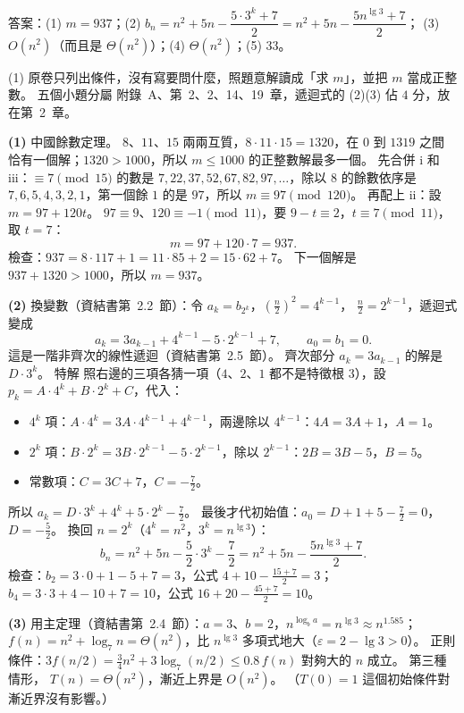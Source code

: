 \begin{pastsoln}
答案：(1) $m = 937$；(2) $b_n = n^2 + 5n - \dfrac{5 \cdot 3^k + 7}{2} = n^2 + 5n - \dfrac{5n^{\lg 3} + 7}{2}$；
(3) $O(n^2)$（而且是 $\Theta(n^2)$）；(4) $\Theta(n^2)$；(5) $33$。

(1) 原卷只列出條件，沒有寫要問什麼，照題意解讀成「求 $m$」，並把 $m$ 當成正整數。 五個小題分屬
附錄~A、第~2、2、14、19~章，遞迴式的 (2)(3) 佔 $4$ 分，放在第~2~章。

\textbf{(1)} 中國餘數定理。 $8$、$11$、$15$ 兩兩互質，$8 \cdot 11 \cdot 15 = 1320$，在 $0$ 到 $1319$ 之間
恰有一個解；$1320 > 1000$，所以 $m \le 1000$ 的正整數解最多一個。 先合併 i 和 iii：$\equiv 7 \pmod{15}$
的數是 $7, 22, 37, 52, 67, 82, 97, \ldots$，除以 $8$ 的餘數依序是 $7, 6, 5, 4, 3, 2, 1$，第一個餘 $1$ 的是
$97$，所以 $m \equiv 97 \pmod{120}$。 再配上 ii：設 $m = 97 + 120t$。 $97 \equiv 9$、$120 \equiv -1
\pmod{11}$，要 $9 - t \equiv 2$，$t \equiv 7 \pmod{11}$，取 $t = 7$：
\[
m = 97 + 120 \cdot 7 = 937 .
\]
檢查：$937 = 8 \cdot 117 + 1 = 11 \cdot 85 + 2 = 15 \cdot 62 + 7$。 下一個解是 $937 + 1320 > 1000$，所以
$m = 937$。

\textbf{(2)} 換變數（資結書第~2.2~節）：令 $a_k = b_{2^k}$，$\left(\frac n2\right)^2 = 4^{k-1}$，
$\frac n2 = 2^{k-1}$，遞迴式變成
\[
a_k = 3a_{k-1} + 4^{k-1} - 5 \cdot 2^{k-1} + 7,\qquad a_0 = b_1 = 0 .
\]
這是一階非齊次的線性遞迴（資結書第~2.5~節）。 齊次部分 $a_k = 3a_{k-1}$ 的解是 $D \cdot 3^k$。 特解
照右邊的三項各猜一項（$4$、$2$、$1$ 都不是特徵根 $3$），設 $p_k = A \cdot 4^k + B \cdot 2^k + C$，代入：
\begin{itemize}
\item $4^k$ 項：$A \cdot 4^k = 3A \cdot 4^{k-1} + 4^{k-1}$，兩邊除以 $4^{k-1}$：$4A = 3A + 1$，$A = 1$。
\item $2^k$ 項：$B \cdot 2^k = 3B \cdot 2^{k-1} - 5 \cdot 2^{k-1}$，除以 $2^{k-1}$：$2B = 3B - 5$，$B = 5$。
\item 常數項：$C = 3C + 7$，$C = -\frac72$。
\end{itemize}
所以 $a_k = D \cdot 3^k + 4^k + 5 \cdot 2^k - \frac72$。 最後才代初始值：$a_0 = D + 1 + 5 - \frac72 = 0$，
$D = -\frac52$。 換回 $n = 2^k$（$4^k = n^2$，$3^k = n^{\lg 3}$）：
\[
b_n = n^2 + 5n - \frac{5}{2} \cdot 3^k - \frac{7}{2} = n^2 + 5n - \frac{5n^{\lg 3} + 7}{2}.
\]
檢查：$b_2 = 3 \cdot 0 + 1 - 5 + 7 = 3$，公式 $4 + 10 - \frac{15 + 7}{2} = 3$；$b_4 = 3 \cdot 3 + 4 - 10 + 7
= 10$，公式 $16 + 20 - \frac{45 + 7}{2} = 10$。

\textbf{(3)} 用主定理（資結書第~2.4~節）：$a = 3$、$b = 2$，$n^{\log_b a} = n^{\lg 3} \approx n^{1.585}$；
$f(n) = n^2 + \log_7 n = \Theta(n^2)$，比 $n^{\lg 3}$ 多項式地大（$\varepsilon = 2 - \lg 3 > 0$）。 正則
條件：$3f(n/2) = \frac34 n^2 + 3\log_7(n/2) \le 0.8\, f(n)$ 對夠大的 $n$ 成立。 第三種情形，
$T(n) = \Theta(n^2)$，漸近上界是 $O(n^2)$。 （$T(0) = 1$ 這個初始條件對漸近界沒有影響。）


\end{pastsoln}
